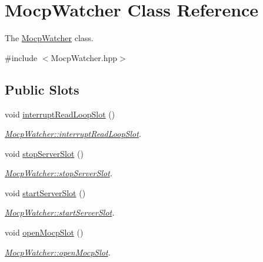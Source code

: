 \hypertarget{class_mocp_watcher}{\section{\-Mocp\-Watcher \-Class \-Reference}
\label{class_mocp_watcher}
}


\-The \hyperlink{class_mocp_watcher}{\-Mocp\-Watcher} class.  




{\ttfamily \#include $<$\-Mocp\-Watcher.\-hpp$>$}

\subsection*{\-Public \-Slots}
\begin{DoxyCompactItemize}
\item 
void \hyperlink{class_mocp_watcher_a9e2dde0e726fdb6a8da673434c05b274}{interrupt\-Read\-Loop\-Slot} ()
\begin{DoxyCompactList}\small\item\em \hyperlink{class_mocp_watcher_a9e2dde0e726fdb6a8da673434c05b274}{\-Mocp\-Watcher\-::interrupt\-Read\-Loop\-Slot}. \end{DoxyCompactList}\item 
void \hyperlink{class_mocp_watcher_ab345d37dbf4b3e8e5582e7a85a88573d}{stop\-Server\-Slot} ()
\begin{DoxyCompactList}\small\item\em \hyperlink{class_mocp_watcher_ab345d37dbf4b3e8e5582e7a85a88573d}{\-Mocp\-Watcher\-::stop\-Server\-Slot}. \end{DoxyCompactList}\item 
void \hyperlink{class_mocp_watcher_a7ad70ec714f839fcd74b37774bb17020}{start\-Server\-Slot} ()
\begin{DoxyCompactList}\small\item\em \hyperlink{class_mocp_watcher_a7ad70ec714f839fcd74b37774bb17020}{\-Mocp\-Watcher\-::start\-Server\-Slot}. \end{DoxyCompactList}\item 
void \hyperlink{class_mocp_watcher_a4779c8ac265c14f31f0f54932fe74012}{open\-Mocp\-Slot} ()
\begin{DoxyCompactList}\small\item\em \hyperlink{class_mocp_watcher_a4779c8ac265c14f31f0f54932fe74012}{\-Mocp\-Watcher\-::open\-Mocp\-Slot}. \end{DoxyCompactList}\end{DoxyCompactItemize}
